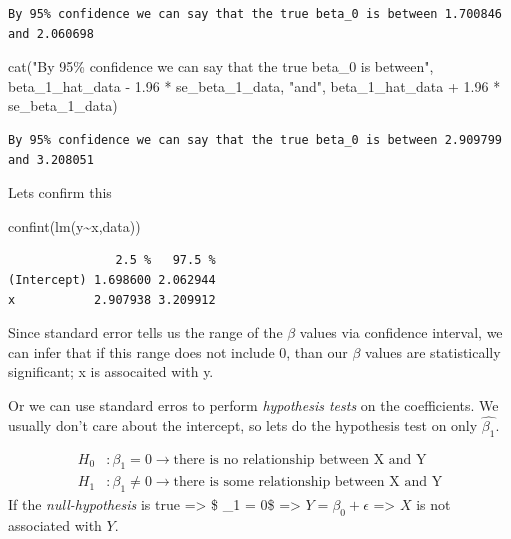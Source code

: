 \documentclass[
  letterpaper,
  DIV=11,
  numbers=noendperiod]{scrreprt}
\newenvironment{Shaded}{\begin{snugshade}}{\end{snugshade}}
\newcommand{\FloatTok}[1]{\textcolor[rgb]{0.68,0.00,0.00}{#1}}
\newcommand{\FunctionTok}[1]{\textcolor[rgb]{0.28,0.35,0.67}{#1}}
\newcommand{\NormalTok}[1]{\textcolor[rgb]{0.00,0.23,0.31}{#1}}
\newcommand{\SpecialCharTok}[1]{\textcolor[rgb]{0.37,0.37,0.37}{#1}}
\newcommand{\StringTok}[1]{\textcolor[rgb]{0.13,0.47,0.30}{#1}}
\begin{document}
\begin{verbatim}
By 95% confidence we can say that the true beta_0 is between 1.700846 and 2.060698
\end{verbatim}

\begin{Shaded}
\begin{Highlighting}[]
\FunctionTok{cat}\NormalTok{(}\StringTok{"By 95\% confidence we can say that the true beta\_0 is between"}\NormalTok{, beta\_1\_hat\_data }\SpecialCharTok{{-}} \FloatTok{1.96} \SpecialCharTok{*}\NormalTok{ se\_beta\_1\_data, }\StringTok{"and"}\NormalTok{, beta\_1\_hat\_data }\SpecialCharTok{+} \FloatTok{1.96} \SpecialCharTok{*}\NormalTok{ se\_beta\_1\_data)}
\end{Highlighting}
\end{Shaded}

\begin{verbatim}
By 95% confidence we can say that the true beta_0 is between 2.909799 and 3.208051
\end{verbatim}

Lets confirm this

\begin{Shaded}
\begin{Highlighting}[]
\FunctionTok{confint}\NormalTok{(}\FunctionTok{lm}\NormalTok{(y}\SpecialCharTok{\textasciitilde{}}\NormalTok{x,data))}
\end{Highlighting}
\end{Shaded}

\begin{verbatim}
               2.5 %   97.5 %
(Intercept) 1.698600 2.062944
x           2.907938 3.209912
\end{verbatim}

Since standard error tells us the range of the \(\beta\) values via
confidence interval, we can infer that if this range does not include 0,
than our \(\beta\) values are statistically significant; x is assocaited
with y.

Or we can use standard erros to perform \emph{hypothesis tests} on the
coefficients. We usually don't care about the intercept, so lets do the
hypothesis test on only \(\hat{\beta_1}\).

\[
\begin{align}
H_0 &: \beta_1 = 0 \to \text{there is no relationship between X and Y} \\
H_1 &: \beta_1 \neq 0 \to \text{there is some relationship between X and Y}
\end{align}
\] If the \emph{null-hypothesis} is true =\textgreater{} \$ \beta\_1 =
0\$ =\textgreater{} \(Y = \beta_0 + \epsilon\) =\textgreater{} \(X\) is
not associated with \(Y\).
\end{document}
